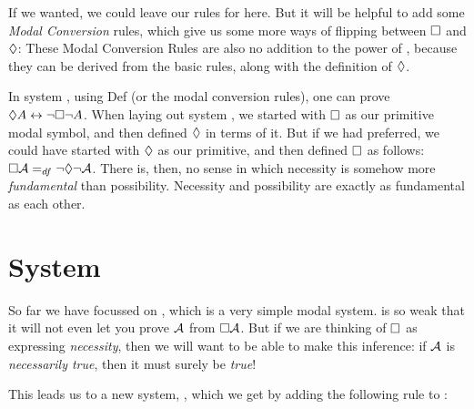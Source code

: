 If we wanted, we could leave our rules for \mlK{} here. But it will be helpful to add some \emph{Modal Conversion} rules, which give us some more ways of flipping between $\Box$ and $\Diamond$:
These Modal Conversion Rules are also no addition to the power of \mlK, because they can be derived from the basic rules, along with the definition of $\Diamond$.

In system \mlK, using Def\ediamond{} (or the modal conversion rules), one can prove $\Diamond A \leftrightarrow \neg\Box\neg A$. When laying out system \mlK, we started with $\Box$ as our primitive modal symbol, and then defined $\Diamond$ in terms of it. But if we had preferred, we could have started with $\Diamond$ as our primitive, and then defined $\Box$ as follows: $\Box\mathcal{A} =_{df} \neg \Diamond \neg \mathcal{A}$. There is, then, no sense in which necessity is somehow more \emph{fundamental} than possibility. Necessity and possibility are exactly as fundamental as each other.

\section{System \mlT}
\label{T}

So far we have focussed on \mlK, which is a very simple modal system. \mlK{} is so weak that it will not even let you prove $\mathcal{A}$ from $\Box\mathcal{A}$. But if we are thinking of $\Box$ as expressing \emph{necessity}, then we will want to be able to make this inference: if $\mathcal{A}$ is \emph{necessarily true}, then it must surely be \emph{true}!

This leads us to a new system,  \mlT, which we get by adding the following rule to \mlK:

